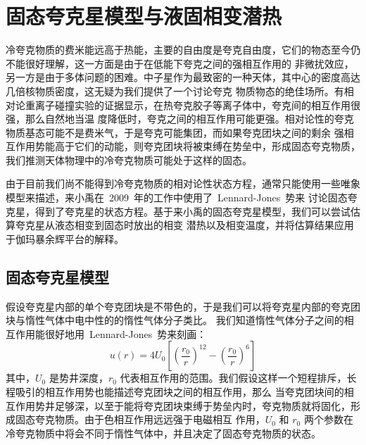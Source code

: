 %
%

	\chapter{固态夸克星模型与液固相变潜热}
	\label{chap2}

	冷夸克物质的费米能远高于热能，主要的自由度是夸克自由度，它们的物态至今仍不能很好理解，这一方面是由于在低能下夸克之间的强相互作用的
	非微扰效应，另一方是由于多体问题的困难。中子星作为最致密的一种天体，其中心的密度高达几倍核物质密度，这无疑为我们提供了一个讨论夸克
	物质物态的绝佳场所。有相对论重离子碰撞实验的证据显示，在热夸克胶子等离子体中，夸克间的相互作用很强，那么自然地当温
	度降低时，夸克之间的相互作用可能更强。相对论性的夸克物质基态可能不是费米气，于是夸克可能集团，而如果夸克团块之间的剩余
	强相互作用势能高于它们的动能，则夸克团块将被束缚在势垒中，形成固态夸克物质，我们推测天体物理中的冷夸克物质可能处于这样的固态。

	由于目前我们尚不能得到冷夸克物质的相对论性状态方程，通常只能使用一些唯象模型来描述，来小禹在~2009~年的工作中使用了~Lennard-Jones~势来
	讨论固态夸克星，得到了夸克星的状态方程。基于来小禹的固态夸克星模型，我们可以尝试估算夸克星从液态相变到固态时放出的相变
	潜热以及相变温度，并将估算结果应用于伽玛暴余辉平台的解释。


	\section{固态夸克星模型}
	\label{chap2:sec1}

	假设夸克星内部的单个夸克团块是不带色的，于是我们可以将夸克星内部的夸克团块与惰性气体中电中性的的惰性气体分子类比。
	我们知道惰性气体分子之间的相互作用能很好地用~Lennard-Jones~势来刻画：
	\begin{equation}
	u(r)=4U_{0}[(\frac{r_{0}}{r})^{12}-(\frac{r_{0}}{r})^{6}]
	\end{equation}
	其中，$U_{0}$ 是势井深度，$r_{0}$ 代表相互作用的范围。我们假设这样一个短程排斥，长程吸引的相互作用势也能描述夸克团块之间的相互作用，那么
	当夸克团块间的相互作用势井足够深，以至于能将夸克团块束缚于势垒内时，夸克物质就将固化，形成固态夸克物质。由于色相互作用远远强于电磁相互
	作用，$U_{0}$ 和 $r_{0}$ 两个参数在冷夸克物质中将会不同于惰性气体中，并且决定了固态夸克物质的状态。

